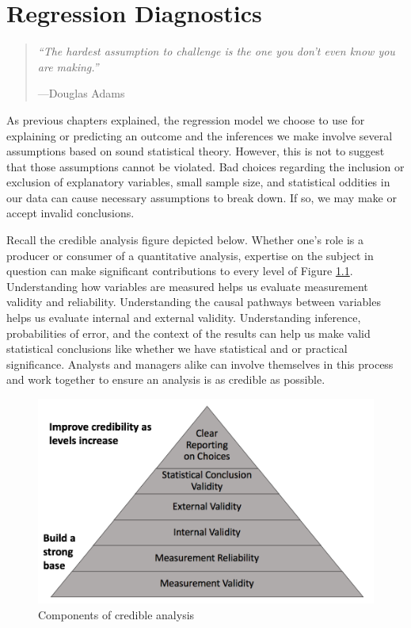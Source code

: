 \documentclass[
]{book}
\begin{document}
\hypertarget{regression-diagnostics}{%
\chapter{Regression Diagnostics}\label{regression-diagnostics}}

\begin{quote}
\emph{``The hardest assumption to challenge is the one you don't even know you are making.''}

---Douglas Adams
\end{quote}

As previous chapters explained, the regression model we choose to use for explaining or predicting an outcome and the inferences we make involve several assumptions based on sound statistical theory. However, this is not to suggest that those assumptions cannot be violated. Bad choices regarding the inclusion or exclusion of explanatory variables, small sample size, and statistical oddities in our data can cause necessary assumptions to break down. If so, we may make or accept invalid conclusions.

Recall the credible analysis figure depicted below. Whether one's role is a producer or consumer of a quantitative analysis, expertise on the subject in question can make significant contributions to every level of Figure \ref{fig:credfigrepeat2}. Understanding how variables are measured helps us evaluate measurement validity and reliability. Understanding the causal pathways between variables helps us evaluate internal and external validity. Understanding inference, probabilities of error, and the context of the results can help us make valid statistical conclusions like whether we have statistical and or practical significance. Analysts and managers alike can involve themselves in this process and work together to ensure an analysis is as credible as possible.

\begin{figure}

{\centering \includegraphics[width=\textwidth]{images/credible} 

}

\caption{Components of credible analysis}\label{fig:credfigrepeat2}
\end{figure}
\end{document}
